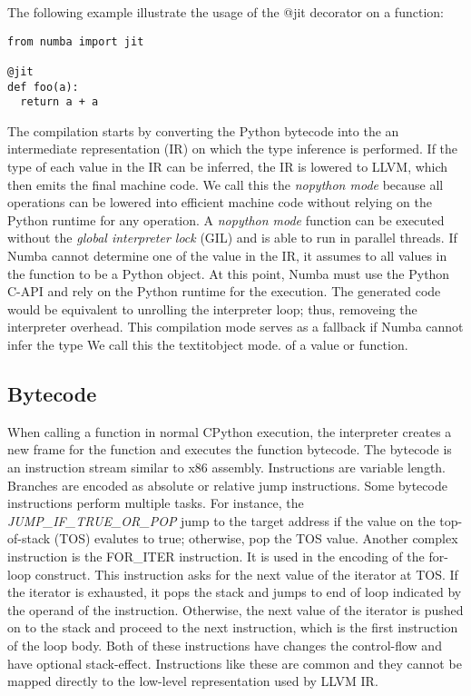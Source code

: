 \documentclass{acm_proc_article-sp}
\begin{document}
The following example illustrate the usage of the @jit decorator on a function:


\begin{lstlisting}
from numba import jit

@jit
def foo(a):
  return a + a
\end{lstlisting}

The compilation starts by converting the Python bytecode into the an
intermediate representation (IR) on which the type inference
is performed. If the type of each value in the IR can be inferred, the IR is
lowered to LLVM, which then emits the final machine code.  We call this the
\textit{nopython mode} because all operations can be lowered into efficient
machine code without relying on the Python runtime for any operation.
A \textit{nopython mode} function can be executed without the \textit{global
interpreter lock} (GIL) and is able to run in parallel threads.
If Numba cannot determine one of the value in the IR,
it assumes to all values in the function to be a Python object. At this point,
Numba must use the Python C-API and rely on the Python runtime for the
execution. The generated code would be equivalent to unrolling the interpreter
loop; thus, removeing the interpreter overhead.
This compilation mode serves as a fallback if Numba cannot infer the type
We call this the textit{object mode}.
of a value or function.

\subsection{Bytecode}

When calling a function in normal CPython execution, the interpreter creates
a new frame for the function and executes the function bytecode.
The bytecode is an instruction stream similar to x86 assembly.
Instructions are variable length. Branches are encoded as absolute or relative
jump instructions. Some bytecode instructions perform multiple tasks.
For instance, the \textit{JUMP\_IF\_TRUE\_OR\_POP} jump to the
target address if the value on the top-of-stack (TOS) evalutes to true;
otherwise, pop the TOS value.  Another complex instruction is the FOR\_ITER
instruction.  It is used in the encoding of the for-loop construct.
This instruction asks for the next value of the iterator at TOS.
If the iterator is exhausted, it pops the stack and jumps to end of loop
indicated by the operand of the instruction.  Otherwise, the next value of the
iterator is pushed on to the stack and proceed to the next instruction, which
is the first instruction of the loop body. Both of these instructions have
changes the control-flow and have optional stack-effect. \cite{pythondoc:dis}
Instructions like these are common and they cannot be mapped directly to
the low-level representation used by LLVM IR.
\end{document}
